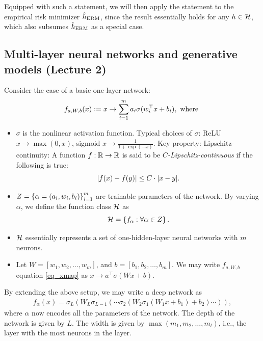 Equipped with such a statement, we will then apply the statement to the empirical risk minimizer $\hat h_{\textup{ERM}}$, since the result essentially holds for any $h \in \mathcal{H}$, which also subsumes $\hat h_{\textup{ERM}}$ as a special case.

\subsection{Multi-layer neural networks and generative models (Lecture 2)}

Consider the case of a basic one-layer network:
\begin{align}\label{eq_xmap}
    f_{a, W, b}(x) := x \rightarrow \sum_{i=1}^m a_i \sigma(w_i^{\top} x + b_i), \text{ where }
\end{align}
\begin{itemize}
    \item $\sigma$ is the nonlinear activation function. Typical choices of $\sigma$: ReLU $x\rightarrow\max(0, x)$, sigmoid $x \rightarrow \frac 1 {1 + \exp(-x)}$. Key property: Lipschitz-continuity: A function $f: \mathbb{R} \rightarrow \mathbb{R}$ is said to be \emph{$C$-Lipschitz-continuous} if the following is true: \[ {\left| {f(x) - f(y)} \right|} \le C \cdot {\left| {x - y} \right|}. \]
    
    \item $Z = \left\{\alpha = (a_i, w_i, b_i)\right\}_{i=1}^m$ are trainable parameters of the network. By varying $\alpha$, we define the function class $\mathcal{H}$ as
    \[ \mathcal{H} = \left\{f_{\alpha} : \forall \alpha \in Z\right\}. \]
    
    \item $\mathcal{H}$ essentially represents a set of one-hidden-layer neural networks with $m$ neurons.

    \item Let $W = [w_1, w_2, \dots, w_m]$, and $b = [b_1, b_2, \dots, b_m]$. We may write $f_{a, W, b}$ equation \eqref{eq_xmap} as $x\rightarrow a^{\top} \sigma(W x + b)$.
\end{itemize}

By extending the above setup, we may write a deep network as
\begin{align}
    f_{\alpha}(x) = \sigma_L\left( W_L \sigma_{L-1} \left( \cdots \sigma_2 \left(W_2 \sigma_1 \left( W_1 x + b_1 \right) + b_2 \right) \cdots \right) \right),
\end{align}
where $\alpha$ now encodes all the parameters of the network.
The depth of the network is given by $L$.
The width is given by $\max(m_1, m_2, \dots, m_l)$, i.e., the layer with the most neurons in the layer.

